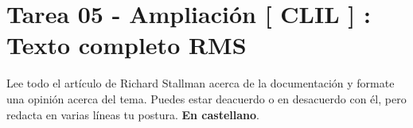 \documentclass[11pt]{article}
\begin{document}
\section{Tarea 05 - Ampliación [ CLIL ] : Texto completo RMS}
\label{sec:org928f756}

Lee todo el artículo de Richard Stallman acerca de la documentación y formate una opinión acerca del tema.
Puedes estar deacuerdo o en desacuerdo con él, pero redacta en varias líneas tu postura. \textbf{En castellano}.
\end{document}
